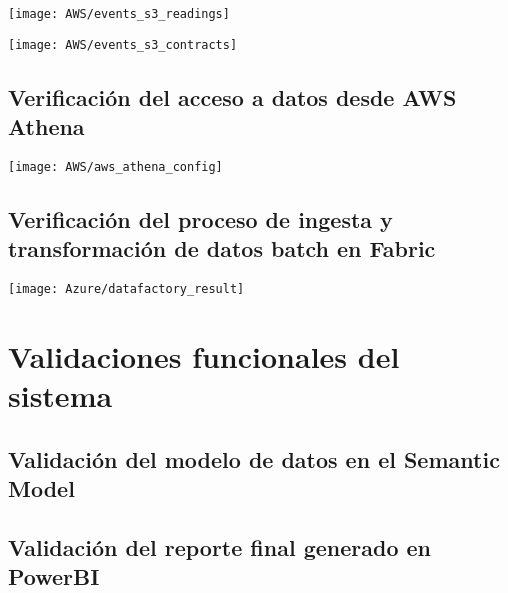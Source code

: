 \begin{center}
   \texttt{[image: AWS/events\_s3\_readings]}
   \label{fig:events_s3_readings}
\end{center}


\begin{center}
   \texttt{[image: AWS/events\_s3\_contracts]}
   \label{fig:events_s3_contracts}
\end{center}


\subsection{Verificación del acceso a datos desde AWS Athena}



\begin{center}
   \texttt{[image: AWS/aws\_athena\_config]}
   \label{fig:aws_athena_config}
\end{center}





\subsection{Verificación del proceso de ingesta y transformación de datos batch en Fabric}


\begin{center}
   \texttt{[image: Azure/datafactory\_result]}
   \label{fig:powerbi1}
\end{center}
 
 

\section{Validaciones funcionales del sistema}



\subsection{Validación del modelo de datos en el Semantic Model}

\subsection{Validación del reporte final generado en PowerBI}


